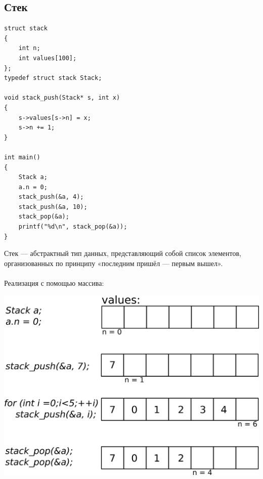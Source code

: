 \documentclass{article}
\begin{document}
\subsection*{Стек}
\begin{multicols}{2}
\begin{verbatim}
struct stack
{
    int n;
    int values[100];
};
typedef struct stack Stack;

void stack_push(Stack* s, int x)
{
    s->values[s->n] = x;
    s->n += 1;
}

int main()
{
    Stack a;
    a.n = 0;
    stack_push(&a, 4);
    stack_push(&a, 10);
    stack_pop(&a);
    printf("%d\n", stack_pop(&a));
}
\end{verbatim}
Стек — абстрактный тип данных, представляющий собой список элементов, организованных по принципу «последним пришёл — первым вышел». \\
\\
Реализация с помощью массива:

\begin{center}
\includegraphics[width=0.95\linewidth]{../images/stack.png}
\end{center}
\end{multicols}
\end{document}
